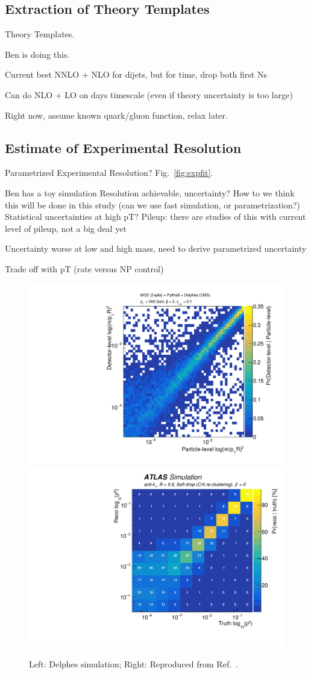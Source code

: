 
\subsection{Extraction of Theory Templates}

	Theory Templates.

	Ben is doing this.

	Current best NNLO + NLO for dijets, but for time, drop both first Ns
 
 Can do NLO + LO on days timescale (even if theory uncertainty is too large)

 Right now, assume known quark/gluon function, relax later.


\subsection{Estimate of Experimental Resolution}

	Parametrized Experimental Resolution? Fig.~\ref{fig:expfit}.

	Ben has a toy simulation
	Resolution achievable, uncertainty?
	How to we think this will be done in this study (can we use fast simulation, or parametrization?)
	Statistical uncertainties at high pT?
	Pileup:  there are studies of this with current level of pileup, not a big deal yet

	Uncertainty worse at low and high mass, need to derive parametrized uncertainty
	
	Trade off with pT (rate versus NP control)

\begin{figure}
\begin{center}
\includegraphics[width = 0.49\columnwidth]{figures/SD_resolution.pdf}\includegraphics[width = 0.49\columnwidth]{figures/figaux_03a.pdf}
\end{center}
\caption{Left: Delphes simulation; Right: Reproduced from Ref.~\cite{Aaboud:2017qwh}.}
\label{fig:expres}
\end{figure}

